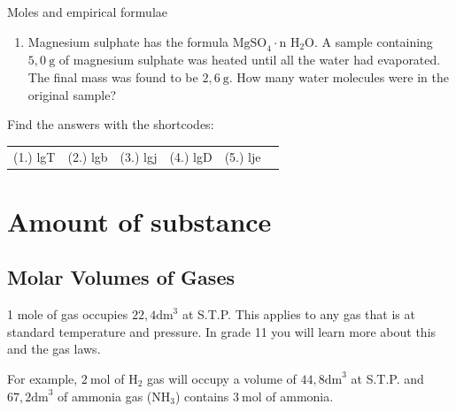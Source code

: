 \begin{exercises}{Moles and empirical formulae
      }
\begin{enumerate}[noitemsep, label=\textbf{\arabic*}. ]
\item Magnesium sulphate has the formula $\text{MgSO}_{4} \cdot \text{n H}_{2}\text{O}$. A sample containing $5,0 ~\text{g}$ of magnesium sulphate was heated until all the water had evaporated. The final mass was found to be $2,6~\text{g}$. How many water molecules were in the original sample?
\end{enumerate}
    \label{m38712*cid7}
\par {} Find the answers with the shortcodes:
 \par \begin{tabular}[h]{cccccc}
 (1.) lgT  &  (2.) lgb  &  (3.) lgj  &  (4.) lgD  & (5.) lje \end{tabular}
\end{exercises}
\section{Amount of substance}
            \subsection*{Molar Volumes of Gases}
            \nopagebreak
            \par
            \label{m38712*eip-id1168064596799}
  { \label{m38712*eip-id1168053572222}1 mole of gas occupies $22,4{\text{dm}}^{3}$ at S.T.P. } 
      \label{m38712*id282112}This applies to any gas that is at standard temperature and pressure. In grade 11 you will learn more about this and the gas laws.\par 
For example, $2~\text{mol}$ of $\text{H}_2$ gas will occupy a volume of $44,8{\text{dm}}^{3}$ at S.T.P. and $67,2{\text{dm}}^{3}$ of ammonia gas ($\text{NH}_3$) contains $3~\text{mol}$ of ammonia.
    \label{m38712*cid8}
